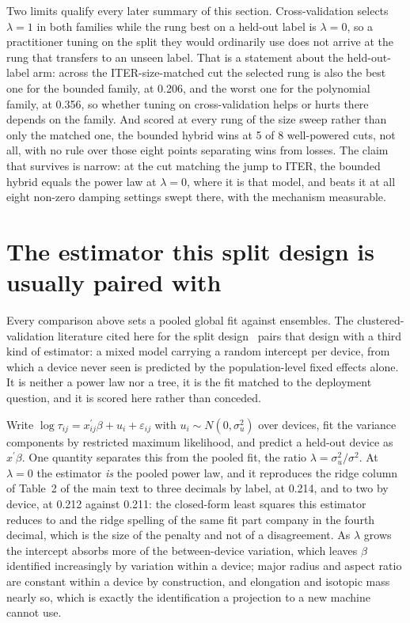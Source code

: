 \documentclass[12pt,letterpaper]{article}
\begin{document}
Two limits qualify every later summary of this section. Cross-validation selects
$\lambda=1$ in both families while the rung best on a held-out label is
$\lambda=0$, so a practitioner tuning on the split they would ordinarily use
does not arrive at the rung that transfers to an unseen label. That is a
statement about the held-out-label arm: across the ITER-size-matched cut the
selected rung is also the best one for the bounded family, at 0.206, and the
worst one for the polynomial family, at 0.356, so whether tuning on
cross-validation helps or hurts there depends on the family. And scored at every rung of the size
sweep rather than only the matched one, the bounded hybrid wins at 5 of 8
well-powered cuts, not all, with no rule over those eight points separating wins
from losses. The claim that survives is narrow: at the cut matching the jump to
ITER, the bounded hybrid equals the power law at $\lambda=0$, where it is that
model, and beats it at all eight non-zero damping settings swept there, with the
mechanism measurable.

\section{The estimator this split design is usually paired with}
\label{supp:mixed}

Every
comparison above sets a pooled global fit against ensembles. The
clustered-validation literature cited here for the split
design~\cite{roberts} pairs that design with a third kind of estimator: a mixed
model carrying a random intercept per device, from which a device never seen is
predicted by the population-level fixed effects alone. It is neither a power law
nor a tree, it is the fit matched to the deployment question, and it is scored
here rather than conceded.

Write $\log\tau_{ij} = x_{ij}^{\prime}\beta + u_i + \varepsilon_{ij}$ with
$u_i\sim N(0,\sigma_u^2)$ over devices, fit the variance components by
restricted maximum likelihood, and predict a held-out device as
$x^{\prime}\beta$. One quantity separates this from the pooled fit, the ratio
$\lambda = \sigma_u^2/\sigma^2$. At $\lambda=0$ the estimator \emph{is} the
pooled power law, and it reproduces the ridge column of
Table~2 of the main text to three decimals by label, at 0.214, and to two by
device, at 0.212 against 0.211: the closed-form least squares this estimator
reduces to and the ridge spelling of the same fit part company in the fourth
decimal, which is the size of the penalty and not of a disagreement. As $\lambda$ grows the intercept absorbs more of the between-device
variation, which leaves $\beta$ identified increasingly by variation within a
device; major radius and aspect ratio are constant within a device by
construction, and elongation and isotopic mass nearly so, which is exactly the
identification a projection to a new machine cannot use.
\end{document}

